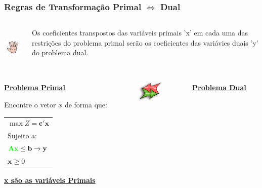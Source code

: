 \documentclass{beamer}
\begin{document}
\begin{frame}
	\frametitle{Regras de Transformação Primal $\Leftrightarrow$ Dual}
	\begin{columns}
		\begin{column}{2cm}
			\includegraphics[width=2cm,height=2cm]{number_5.jpg}
		\end{column}
		\begin{column}{8cm}
			\begin{mdframed}[backgroundcolor=green!70]
				\centering
				Os coeficientes transpostos das variáveis primais 'x' em cada uma das restrições do problema primal serão os coeficientes das variávies duais 'y' do problema dual.
			\end{mdframed}
		\end{column}
	\end{columns}
	\begin{columns}
		\centering
		\begin{column}{4cm}
			\underline{\textbf{Problema Primal}}
			\begin{mdframed}[backgroundcolor=blue!50]
				Encontre o vetor \textbf{$x$} de forma que:
				\begin{table}
					\begin{tabular}{l}
						$ \max Z = \mathbf{c'x}$ \\
						Sujeito a: \\
						$ \mathbf{{\color{green}Ax}} \le \mathbf{b} \rightarrow \mathbf{y} $ \\
						$ \mathbf{x} \ge 0$ \\
					\end{tabular}
				\end{table}
			\end{mdframed}
			\underline{\textbf{x são as variáveis Primais}}
		\end{column}
		\begin{column}{2cm}
			\includegraphics[width=2cm,height=0.9cm]{bi-directional_arrow.png}
		\end{column}
		\begin{column}{4cm}
			\underline{\textbf{Problema Dual}}
			\begin{mdframed}[backgroundcolor=red!50]

\end{mdframed}
\end{column}
\end{columns}
\end{frame}
\end{document}
